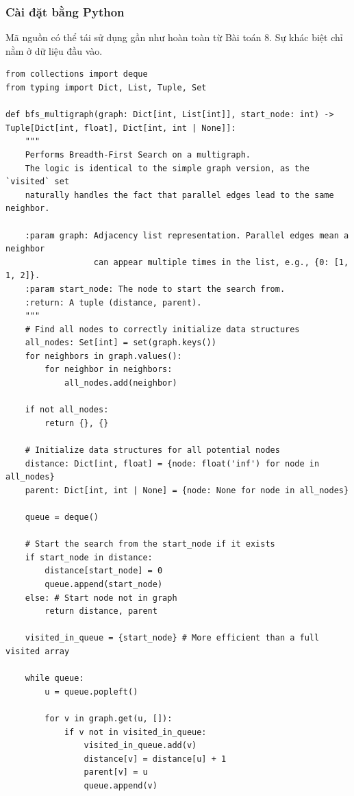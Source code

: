 \documentclass[a4paper,12pt]{article}
\begin{document}
\subsubsection{Cài đặt bằng Python}
Mã nguồn có thể tái sử dụng gần như hoàn toàn từ Bài toán 8. Sự khác biệt chỉ nằm ở dữ liệu đầu vào.
\begin{lstlisting}[style=pythonstyle, caption={Cài đặt BFS cho đa đồ thị trong Python.}, label={lst:python_bfs_9_full}]
from collections import deque
from typing import Dict, List, Tuple, Set

def bfs_multigraph(graph: Dict[int, List[int]], start_node: int) -> Tuple[Dict[int, float], Dict[int, int | None]]:
    """
    Performs Breadth-First Search on a multigraph.
    The logic is identical to the simple graph version, as the `visited` set
    naturally handles the fact that parallel edges lead to the same neighbor.

    :param graph: Adjacency list representation. Parallel edges mean a neighbor
                  can appear multiple times in the list, e.g., {0: [1, 1, 2]}.
    :param start_node: The node to start the search from.
    :return: A tuple (distance, parent).
    """
    # Find all nodes to correctly initialize data structures
    all_nodes: Set[int] = set(graph.keys())
    for neighbors in graph.values():
        for neighbor in neighbors:
            all_nodes.add(neighbor)
    
    if not all_nodes:
        return {}, {}
        
    # Initialize data structures for all potential nodes
    distance: Dict[int, float] = {node: float('inf') for node in all_nodes}
    parent: Dict[int, int | None] = {node: None for node in all_nodes}
    
    queue = deque()

    # Start the search from the start_node if it exists
    if start_node in distance:
        distance[start_node] = 0
        queue.append(start_node)
    else: # Start node not in graph
        return distance, parent

    visited_in_queue = {start_node} # More efficient than a full visited array

    while queue:
        u = queue.popleft()

        for v in graph.get(u, []):
            if v not in visited_in_queue:
                visited_in_queue.add(v)
                distance[v] = distance[u] + 1
                parent[v] = u
                queue.append(v)
                

\end{lstlisting}
\end{document}
